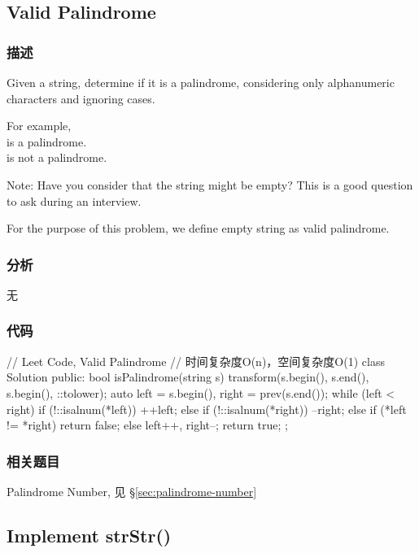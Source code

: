 \subsection{Valid Palindrome} %
\label{sec:valid-palindrome}


\subsubsection{描述}
Given a string, determine if it is a palindrome, considering only alphanumeric characters and ignoring cases.

For example,\\
 is a palindrome.\\
 is not a palindrome.

Note:
Have you consider that the string might be empty? This is a good question to ask during an interview.

For the purpose of this problem, we define empty string as valid palindrome.


\subsubsection{分析}
无


\subsubsection{代码}
\begin{Code}
	// Leet Code, Valid Palindrome
	// 时间复杂度O(n)，空间复杂度O(1)
	class Solution {
		public:
		bool isPalindrome(string s) {
			transform(s.begin(), s.end(), s.begin(), ::tolower);
			auto left = s.begin(), right = prev(s.end());
			while (left < right) {
				if (!::isalnum(*left))  ++left;
				else if (!::isalnum(*right)) --right;
				else if (*left != *right) return false;
				else{ left++, right--; }
			}
			return true;
		}
	};
\end{Code}


\subsubsection{相关题目}
\begindot
\item Palindrome Number, 见 \S \ref{sec:palindrome-number}
\myenddot


\subsection{Implement strStr()} %
\label{sec:strstr}


